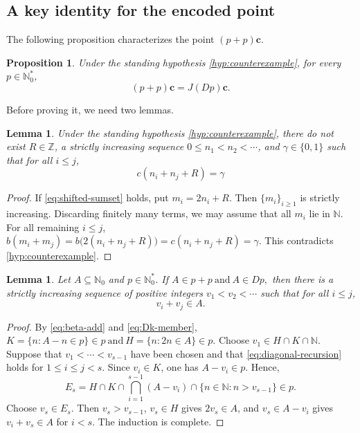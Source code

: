 \documentclass[reqno,12pt]{amsart}
\newtheorem{lemma}[thm]{Lemma}
\newtheorem{prop}[thm]{Proposition}
\newcommand{\Nzero}{\mathbb N_0}
\newcommand{\Nstar}{\Nzero^{*}}
\newcommand{\two}{\{0,1\}}
\def \N {\mathbb N}
\def \Z {\mathbb Z}
\numberwithin{equation}{section}
\begin{document}
\subsection{A key identity for the encoded point}

The following proposition characterizes the point $(p+p){\mathbf c}$.
\begin{prop}\label{prop:key-identity}
	Under the standing hypothesis \eqref{hyp:counterexample}, for every
	$p\in\Nstar$,
	\begin{equation}\label{eq:key-identity}
	(p+p)\mathbf c=J(Dp)\mathbf c.
	\end{equation}
\end{prop}
Before proving it, we need two lemmas.
\begin{lemma}\label{lem:no-shifted-sumset}
	Under the standing hypothesis \eqref{hyp:counterexample}, there do not exist $R\in\Z$, a strictly increasing sequence
	$0\leq n_1<n_2<\cdots$, and $\gamma\in\two$ such that for all $i\leq j$,
	\begin{equation}\label{eq:shifted-sumset}
	c(n_i+n_j+R)=\gamma
	\end{equation}
\end{lemma}
\begin{proof}
If \eqref{eq:shifted-sumset} holds, put $m_i=2n_i+R$. Then
$\{m_i\}_{i\ge 1}$ is strictly increasing. Discarding finitely many terms,
we may assume that all $m_i$ lie in $\N$. For all remaining $i\leq j$,
	$
	b(m_i+m_j)
	=b\bigl(2(n_i+n_j+R)\bigr)
	=c(n_i+n_j+R)
	=\gamma.
	$
This contradicts \eqref{hyp:counterexample}.
\end{proof}
\begin{lemma}\label{lem:diagonal-recursion}
	Let $A\subseteq\Nzero$ and $p\in\Nstar$.  If
	$A\in p+p\ \text{and}\
	A\in Dp, $
	then there is a strictly increasing sequence of positive integers
	$v_1<v_2<\cdots$ such that for all $i\le j$,
	\begin{equation}\label{eq:diagonal-recursion}
	v_i+v_j\in A.
	\end{equation}
\end{lemma}
\begin{proof}
	By \eqref{eq:beta-add} and \eqref{eq:Dk-member},
	$
	K=\{n:A-n\in p\}\in p\ \text{and}\
	H=\{n:2n\in A\}\in p.
	$
	Choose $v_1\in H\cap K\cap\N$.  Suppose that
	$v_1<\cdots<v_{s-1}$ have been chosen and that
	\eqref{eq:diagonal-recursion} holds for $1\leq i\leq j<s$.  Since
	$v_i\in K$, one has $A-v_i\in p$.  Hence,
	\[
	E_s=H\cap K\cap\bigcap_{i=1}^{s-1}(A-v_i)
	\cap\{n\in \N:n>v_{s-1}\}\in p.
	\]
	Choose
	$v_s\in E_s$.  Then $v_s>v_{s-1}$, $v_s\in H$ gives
	$2v_s\in A$, and $v_s\in A-v_i$ gives $v_i+v_s\in A$ for $i<s$.
	The induction is complete.
\end{proof}
\end{document}
